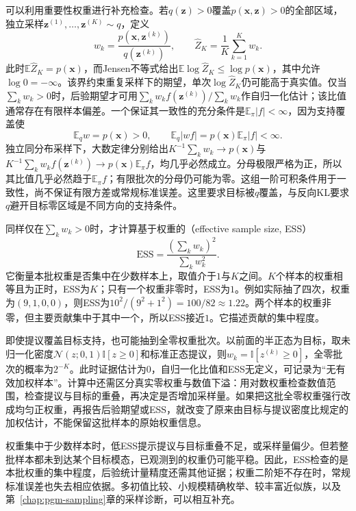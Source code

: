 可以利用重要性权重进行补充检查。若$q(\bm z)>0$覆盖$p(\bm x,\bm z)>0$的全部区域，独立采样$\bm z^{(1)},\ldots,\bm z^{(K)}\sim q$，定义
\begin{equation}
  w_k=\frac{p(\bm x,\bm z^{(k)})}{q(\bm z^{(k)})},
  \qquad
  \widehat Z_K=\frac1K\sum_{k=1}^K w_k.
  \label{eq:pgm-variational-importance}
\end{equation}
此时$\mathbb E\widehat Z_K=p(\bm x)$，而Jensen不等式给出$\mathbb E\log\widehat Z_K\leq\log p(\bm x)$，其中允许$\log0=-\infty$。该界约束重复采样下的期望，单次$\log\widehat Z_K$仍可能高于真实值。仅当$\sum_kw_k>0$时，后验期望才可用$\sum_kw_kf(\bm z^{(k)})/\sum_kw_k$作自归一化估计；该比值通常存在有限样本偏差。一个保证其一致性的充分条件是$\mathbb E_\pi|f|<\infty$，因为支持覆盖使
\[
  \mathbb E_qw=p(\bm x)>0,
  \qquad
  \mathbb E_q|wf|=p(\bm x)\mathbb E_\pi|f|<\infty.
\]
独立同分布采样下，大数定律分别给出$K^{-1}\sum_kw_k\to p(\bm x)$与$K^{-1}\sum_kw_k\allowbreak f(\bm z^{(k)})\to p(\bm x)\allowbreak\mathbb E_\pi f$，均几乎必然成立。分母极限严格为正，所以其比值几乎必然趋于$\mathbb E_\pi f$；有限批次的分母仍可能为零。这组一阶可积条件用于一致性，尚不保证有限方差或常规标准误差。这里要求目标被$q$覆盖，与反向KL要求$q$避开目标零区域是不同方向的支持条件。

同样仅在$\sum_kw_k>0$时，才计算基于权重的（effective sample size, ESS）
\[
  \widehat{\mathrm{ESS}}
  =\frac{(\sum_kw_k)^2}{\sum_kw_k^2}.
\]
它衡量本批权重是否集中在少数样本上，取值介于$1$与$K$之间。$K$个样本的权重相等且为正时，ESS为$K$；只有一个权重非零时，ESS为$1$。例如实际抽了四次，权重为$(9,1,0,0)$，则ESS为$10^2/(9^2+1^2)=100/82\approx1.22$。两个样本的权重非零，但主要贡献集中于其中一个，所以ESS接近$1$。它描述贡献的集中程度。

即使提议覆盖目标支持，也可能抽到全零权重批次。以前面的半正态为目标，取未归一化密度$\mathcal N(z;0,1)\mathbb I[z\geq0]$和标准正态提议，则$w_k=\mathbb I[z^{(k)}\geq0]$，全零批次的概率为$2^{-K}$。此时证据估计为$0$，自归一化比值和ESS无定义，可记录为“无有效加权样本”。计算中还需区分真实零权重与数值下溢：用对数权重检查数值范围，检查提议与目标的重叠，再决定是否增加采样量。如果把这批全零权重强行改成均匀正权重，再报告后验期望或ESS，就改变了原来由目标与提议密度比规定的加权估计，不能保留这批样本的原始权重信息。

权重集中于少数样本时，低ESS提示提议与目标重叠不足，或采样量偏少。但若整批样本都未到达某个目标模态，已观测到的权重仍可能平稳。因此，ESS检查的是本批权重的集中程度，后验统计量精度还需其他证据；权重二阶矩不存在时，常规标准误差也失去相应依据。多初值比较、小规模精确枚举、较丰富近似族，以及第~\ref{chap:pgm-sampling}章的采样诊断，可以相互补充。

